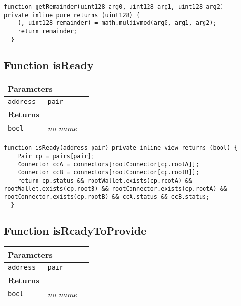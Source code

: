 \vspace{2cm}

\begin{lstlisting}[firstnumber=115]
  function getRemainder(uint128 arg0, uint128 arg1, uint128 arg2) private inline pure returns (uint128) {
    (, uint128 remainder) = math.muldivmod(arg0, arg1, arg2);
    return remainder;
  }
\end{lstlisting}

\subsection{Function isReady}


\ifsoltables
\noindent\begin{tabular}{|l|l|p{5cm}|}\hline
\multicolumn{3}{|l|}{\bf Parameters}\\\hline
\tt address & \tt pair &\\\hline
\multicolumn{3}{|l|}{\bf Returns}\\\hline
\tt bool & {\em no name} &\\\hline
\end{tabular}
\fi

\vspace{2cm}

\begin{lstlisting}[firstnumber=198]
  function isReady(address pair) private inline view returns (bool) {
    Pair cp = pairs[pair];
    Connector ccA = connectors[rootConnector[cp.rootA]];
    Connector ccB = connectors[rootConnector[cp.rootB]];
    return cp.status && rootWallet.exists(cp.rootA) && rootWallet.exists(cp.rootB) && rootConnector.exists(cp.rootA) && rootConnector.exists(cp.rootB) && ccA.status && ccB.status;
  }
\end{lstlisting}

\subsection{Function isReadyToProvide}


\ifsoltables
\noindent\begin{tabular}{|l|l|p{5cm}|}\hline
\multicolumn{3}{|l|}{\bf Parameters}\\\hline
\tt address & \tt pair &\\\hline
\multicolumn{3}{|l|}{\bf Returns}\\\hline
\tt bool & {\em no name} &\\\hline
\end{tabular}
\fi

